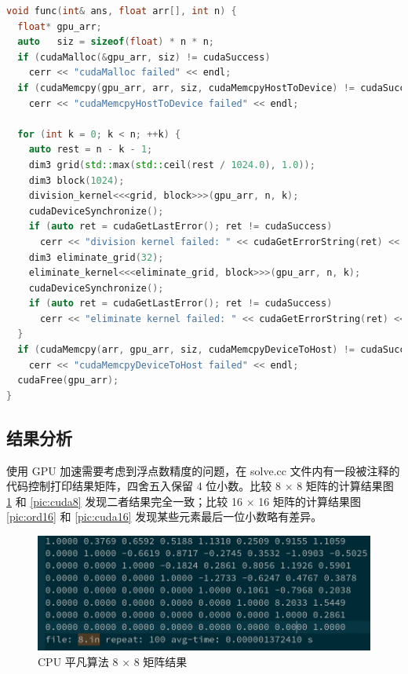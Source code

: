 \documentclass[a4paper]{article}
\begin{document}
\begin{lstlisting}[frame=trbl,language={C++}]
void func(int& ans, float arr[], int n) {
  float* gpu_arr;
  auto   siz = sizeof(float) * n * n;
  if (cudaMalloc(&gpu_arr, siz) != cudaSuccess)
    cerr << "cudaMalloc failed" << endl;
  if (cudaMemcpy(gpu_arr, arr, siz, cudaMemcpyHostToDevice) != cudaSuccess)
    cerr << "cudaMemcpyHostToDevice failed" << endl;

  for (int k = 0; k < n; ++k) {
    auto rest = n - k - 1;
    dim3 grid(std::max(std::ceil(rest / 1024.0), 1.0));
    dim3 block(1024);
    division_kernel<<<grid, block>>>(gpu_arr, n, k);
    cudaDeviceSynchronize();
    if (auto ret = cudaGetLastError(); ret != cudaSuccess)
      cerr << "division kernel failed: " << cudaGetErrorString(ret) << endl;
    dim3 eliminate_grid(32);
    eliminate_kernel<<<eliminate_grid, block>>>(gpu_arr, n, k);
    cudaDeviceSynchronize();
    if (auto ret = cudaGetLastError(); ret != cudaSuccess)
      cerr << "eliminate kernel failed: " << cudaGetErrorString(ret) << endl;
  }
  if (cudaMemcpy(arr, gpu_arr, siz, cudaMemcpyDeviceToHost) != cudaSuccess)
    cerr << "cudaMemcpyDeviceToHost failed" << endl;
  cudaFree(gpu_arr);
}
\end{lstlisting}

\subsection{结果分析}

使用 GPU 加速需要考虑到浮点数精度的问题，在 solve.cc 文件内有一段被注释的代码控制打印结果矩阵，四舍五入保留 4 位小数。比较 8 × 8 矩阵的计算结果图 \ref{pic:ord8} 和 \ref{pic:cuda8} 发现二者结果完全一致；比较 16 × 16 矩阵的计算结果图 \ref{pic:ord16} 和 \ref{pic:cuda16} 发现某些元素最后一位小数略有差异。

\begin{figure}[h]
  \centering
  \includegraphics[width=\textwidth]{ord8.png}
  \caption{CPU 平凡算法 8 × 8 矩阵结果}
  \label{pic:ord8}
\end{figure}
\end{document}
